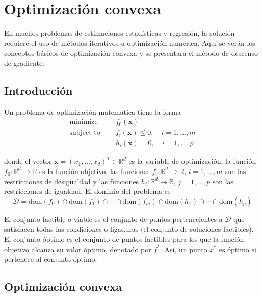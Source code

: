 \chapter{Optimización convexa}\label{ChapterG} 

En muchos problemas de estimaciones estadísticas y regresión, la solución requiere el uso de métodos iterativos u optimización numérica. Aquí se verán los conceptos básicos de optimización convexa y se presentará el método de descenso de gradiente.

\section{Introducción}

\noindent Un problema de optimización matemática tiene la forma 
\begin{align}
\text{minimize } \quad & f_0(\mathbf{x}) \\
\text{subject to } \quad & f_i(\mathbf{x}) \leq 0, \quad i = 1, \ldots, m \\
& h_i(\mathbf{x}) = 0, \quad i = 1, \ldots, p 
\end{align}

\noindent donde el vector $\mathbf{x} = (x_1, \dots, x_d)^T \in \mathbb{R}^d$ es la variable de optimización, la función $f_0: \mathbb{R}^d \to \mathbb{R}$ es la función objetivo, las funciones $f_i: \mathbb{R}^d \to \mathbb{R}$, $i = 1, \dots, m$ son las restricciones de desigualdad y las funciones $h_i: \mathbb{R}^d \to \mathbb{R}$, $j = 1, \dots, p$ son las restricciones de igualdad. El dominio del problema es 
\begin{equation*}
\mathcal{D} = \text{dom}(f_0) \cap \text{dom}(f_1) \cap \cdots \cap \text{dom}(f_m) \cap \text{dom}(h_1) \cap \cdots \cap \text{dom}(h_p)
\end{equation*}

El conjunto factible o viable es el conjunto de puntos pertenecientes a $\mathcal{D}$ que satisfacen todas las condiciones o ligaduras (el conjunto de soluciones factibles). El conjunto óptimo es el conjunto de puntos factibles para los que la función objetivo alcanza su valor óptimo, denotado por $f^*$. Así, un punto $x^*$ es óptimo si pertenece al conjunto óptimo. 

\section{Optimización convexa}

